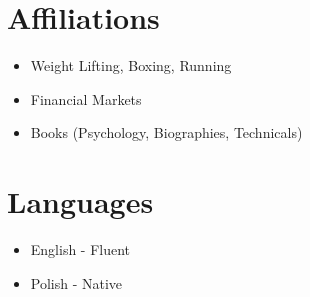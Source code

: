 \documentclass[a4paper,10pt]{article}
\begin{document}
\section*{Affiliations}
\begin{itemize}[leftmargin=*]
    \item Weight Lifting, Boxing, Running
    \item Financial Markets
    \item Books (Psychology, Biographies, Technicals)
\end{itemize}

\section*{Languages}
\begin{itemize}[leftmargin=*]
    \item English - Fluent
    \item Polish - Native
\end{itemize}
\end{document}
